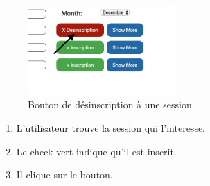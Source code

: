 \begin{figure}[h]
	\includegraphics[width=0.5\textwidth,center]{Figures/us5-1}
	\caption{Bouton de désinscription à une session}
\end{figure}

\begin{enumerate}
	\item L'utilisateur trouve la session qui l'interesse.
	\item Le check vert indique qu'il est inscrit.
	\item Il clique sur le bouton.
\end{enumerate}